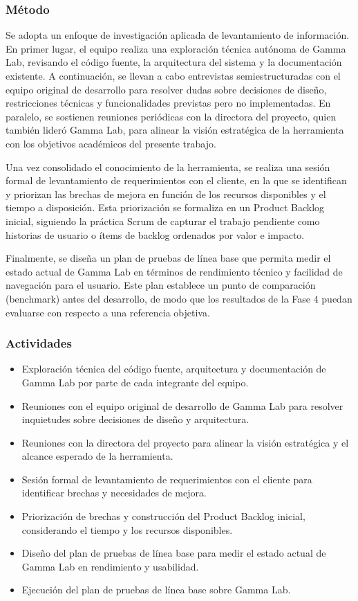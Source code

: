 \documentclass[12pt,letterpaper]{article}
\begin{document}
\subsubsection{Método}
Se adopta un enfoque de investigación aplicada de levantamiento de información. En primer lugar, el equipo realiza una exploración técnica autónoma de Gamma Lab, revisando el código fuente, la arquitectura del sistema y la documentación existente. A continuación, se llevan a cabo entrevistas semiestructuradas con el equipo original de desarrollo para resolver dudas sobre decisiones de diseño, restricciones técnicas y funcionalidades previstas pero no implementadas. En paralelo, se sostienen reuniones periódicas con la directora del proyecto, quien también lideró Gamma Lab, para alinear la visión estratégica de la herramienta con los objetivos académicos del presente trabajo.

Una vez consolidado el conocimiento de la herramienta, se realiza una sesión formal de levantamiento de requerimientos con el cliente, en la que se identifican y priorizan las brechas de mejora en función de los recursos disponibles y el tiempo a disposición. Esta priorización se formaliza en un Product Backlog inicial, siguiendo la práctica Scrum de capturar el trabajo pendiente como historias de usuario o ítems de backlog ordenados por valor e impacto.

Finalmente, se diseña un plan de pruebas de línea base que permita medir el estado actual de Gamma Lab en términos de rendimiento técnico y facilidad de navegación para el usuario. Este plan establece un punto de comparación (benchmark) antes del desarrollo, de modo que los resultados de la Fase 4 puedan evaluarse con respecto a una referencia objetiva.


\subsubsection{Actividades}

\begin{itemize}
  \item Exploración técnica del código fuente, arquitectura y documentación de Gamma Lab por parte de cada integrante del equipo.
  \item Reuniones con el equipo original de desarrollo de Gamma Lab para resolver inquietudes sobre decisiones de diseño y arquitectura.
  \item Reuniones con la directora del proyecto para alinear la visión estratégica y el alcance esperado de la herramienta.
  \item Sesión formal de levantamiento de requerimientos con el cliente para identificar brechas y necesidades de mejora.
  \item Priorización de brechas y construcción del Product Backlog inicial, considerando el tiempo y los recursos disponibles.
  \item Diseño del plan de pruebas de línea base para medir el estado actual de Gamma Lab en rendimiento y usabilidad.
  \item Ejecución del plan de pruebas de línea base sobre Gamma Lab.
\end{itemize}
\end{document}
